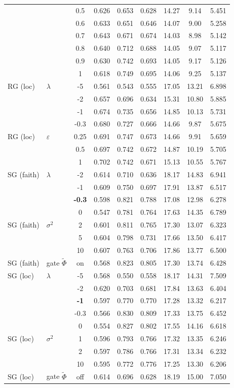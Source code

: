 \begin{longtable}{@{}l l c c c c c c c@{}}
 &  & 0.5 & 0.626 & 0.653 & 0.628 & 14.27 & 9.14 & 5.451 \\
 &  & 0.6 & 0.633 & 0.651 & 0.646 & 14.07 & 9.00 & 5.258 \\
 &  & 0.7 & 0.643 & 0.671 & 0.674 & 14.03 & 8.98 & 5.142 \\
 &  & 0.8 & 0.640 & 0.712 & 0.688 & 14.05 & 9.07 & 5.117 \\
 &  & 0.9 & 0.630 & 0.742 & 0.693 & 14.05 & 9.17 & 5.126 \\
 &  & 1 & 0.618 & 0.749 & 0.695 & 14.06 & 9.25 & 5.137 \\
\midrule
RG (loc) & $\lambda$ & {-}5 & 0.561 & 0.543 & 0.555 & 17.05 & 13.21 & 6.898 \\
 &  & {-}2 & 0.657 & 0.696 & 0.634 & 15.31 & 10.80 & 5.885 \\
 &  & {-}1 & 0.674 & 0.735 & 0.656 & 14.85 & 10.13 & 5.731 \\
 &  & {-}0.3 & 0.680 & 0.727 & 0.666 & 14.66 & 9.87 & 5.675 \\
\midrule
RG (loc) & $\varepsilon$ & 0.25 & 0.691 & 0.747 & 0.673 & 14.66 & 9.91 & 5.659 \\
 &  & 0.5 & 0.697 & 0.742 & 0.672 & 14.87 & 10.19 & 5.705 \\
 &  & 1 & 0.702 & 0.742 & 0.671 & 15.13 & 10.55 & 5.767 \\
\midrule
SG (faith) & $\lambda$ & {-}2 & 0.614 & 0.710 & 0.636 & 18.17 & 14.83 & 6.941 \\
 &  & {-}1 & 0.609 & 0.750 & 0.697 & 17.91 & 13.87 & 6.517 \\
 &  & \textbf{{-}0.3} & 0.598 & 0.821 & 0.788 & 17.08 & 12.98 & 6.278 \\
 &  & 0 & 0.547 & 0.781 & 0.764 & 17.63 & 14.35 & 6.789 \\
\midrule
SG (faith) & $\sigma^2$ & 2 & 0.601 & 0.811 & 0.765 & 17.30 & 13.07 & 6.323 \\
 &  & 5 & 0.604 & 0.798 & 0.731 & 17.66 & 13.50 & 6.417 \\
 &  & 10 & 0.607 & 0.763 & 0.706 & 17.86 & 13.77 & 6.500 \\
\midrule
SG (faith) & gate $\tilde\Phi$ & on & 0.568 & 0.823 & 0.805 & 17.30 & 13.74 & 6.428 \\
\midrule
SG (loc) & $\lambda$ & {-}5 & 0.568 & 0.550 & 0.558 & 18.17 & 14.31 & 7.509 \\
 &  & {-}2 & 0.620 & 0.703 & 0.681 & 17.84 & 13.63 & 6.404 \\
 &  & \textbf{{-}1} & 0.597 & 0.770 & 0.770 & 17.28 & 13.32 & 6.217 \\
 &  & {-}0.3 & 0.566 & 0.830 & 0.809 & 17.33 & 13.75 & 6.452 \\
 &  & 0 & 0.554 & 0.827 & 0.802 & 17.55 & 14.16 & 6.618 \\
\midrule
SG (loc) & $\sigma^2$ & 1 & 0.596 & 0.793 & 0.766 & 17.32 & 13.35 & 6.246 \\
 &  & 2 & 0.597 & 0.786 & 0.766 & 17.31 & 13.34 & 6.232 \\
 &  & 10 & 0.595 & 0.772 & 0.776 & 17.25 & 13.30 & 6.206 \\
\midrule
SG (loc) & gate $\tilde\Phi$ & off & 0.614 & 0.696 & 0.628 & 18.19 & 15.00 & 7.050 \\
\end{longtable}

